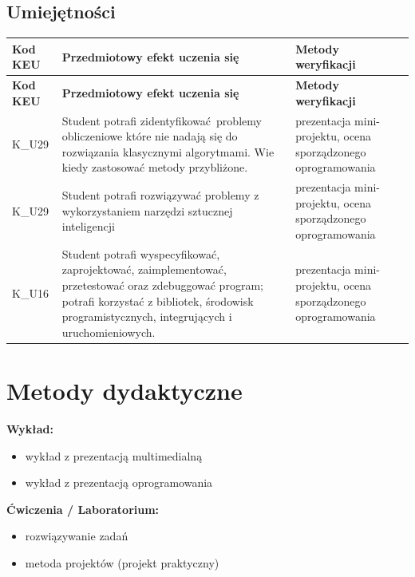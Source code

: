 \documentclass[12pt, a4paper]{article}
\newcommand{\thdrule}{\noalign{\global\setlength{\extrarowheight}{0pt}}}
\newcommand{\thdend}{\noalign{\global\setlength{\extrarowheight}{3pt}}}
\begin{document}
\subsection*{Umiejętności}
{\scriptsize
\begin{longtable}{m{1.6cm}m{9.0cm}m{4.2cm}}
\thdrule\toprule
\rowcolor{pjatkRed} {\color{white}\footnotesize\textbf{\vphantom{Ag}Kod KEU}} & {\color{white}\footnotesize\textbf{\vphantom{Ag}Przedmiotowy efekt uczenia się}} & {\color{white}\footnotesize\textbf{\vphantom{Ag}Metody weryfikacji}} \\
\midrule\thdend
\endfirsthead
\thdrule\toprule
\rowcolor{pjatkRed} {\color{white}\footnotesize\textbf{\vphantom{Ag}Kod KEU}} & {\color{white}\footnotesize\textbf{\vphantom{Ag}Przedmiotowy efekt uczenia się}} & {\color{white}\footnotesize\textbf{\vphantom{Ag}Metody weryfikacji}} \\
\midrule\thdend
\endhead
  \rowcolor{tableRowLight} K\_U29 & Student potrafi zidentyfikować problemy obliczeniowe które nie nadają się do rozwiązania klasycznymi algorytmami. Wie kiedy zastosować metody przybliżone. & prezentacja mini-projektu, ocena sporządzonego oprogramowania \\
  \rowcolor{tableRowAlt} K\_U29 & Student potrafi rozwiązywać problemy z wykorzystaniem narzędzi sztucznej inteligencji & prezentacja mini-projektu, ocena sporządzonego oprogramowania \\
  \rowcolor{tableRowLight} K\_U16 & Student potrafi wyspecyfikować, zaprojektować, zaimplementować, przetestować oraz zdebuggować program; potrafi korzystać z bibliotek, środowisk programistycznych, integrujących i uruchomieniowych. & prezentacja mini-projektu, ocena sporządzonego oprogramowania \\
\bottomrule
\end{longtable}}

\section{Metody dydaktyczne}

\textbf{Wykład:}
\begin{itemize}
  \item wykład z prezentacją multimedialną
  \item wykład z prezentacją oprogramowania
\end{itemize}
\vspace{4pt}
\textbf{Ćwiczenia / Laboratorium:}
\begin{itemize}
  \item rozwiązywanie zadań
  \item metoda projektów (projekt praktyczny)
\end{itemize}
\vspace{4pt}
\end{document}
